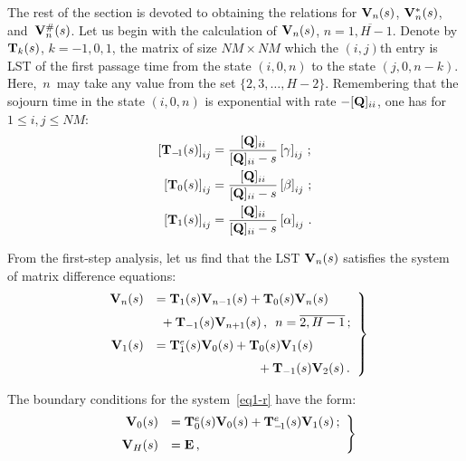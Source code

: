 \begin{multicols}{2}
The rest of the section is devoted to obtaining the relations for
$\mathbf{V}_n(s)$, $\mathbf{V}^*_n(s)$, and~$\mathbf{V}^{\#}_n(s)$.
Let us begin with the calculation of $\mathbf{V}_n(s)$,
$n=\overline{1,H-1}$. 
Denote by 
$\mathbf{T}_k(s)$, $k=-1,0,1$, the 
matrix of size $NM \times NM$ 
which the $(i,j)${th} entry is 
LST of the first passage time
from the state $(i,0,n)$ 
to the state $(j,0,n-k)$.
Here,~$n$~may take any value from 
the set $\{2,3,\dots,H-2\}$. 
Remembering that the sojourn time 
in the state $(i,0,n)$ is exponential 
with rate $-[\mathbf{Q}]_{ii}$, one has for 
$1 \le i,j \le NM$:
\begin{align*}
\left[ \mathbf{T}_{-\!1}(s) \right]_{ij}
&=
\displaystyle\frac{\displaystyle [\mathbf{Q}]_{ii} \mathstrut}{\displaystyle [\mathbf{Q}]_{ii} - s\mathstrut}
\left[\gamma\right]_{ij}  \,;
\\
\left[ \mathbf{T}_0(s) \right]_{ij}
&=
\displaystyle\frac{\displaystyle [\mathbf{Q}]_{ii}\mathstrut}{\displaystyle [\mathbf{Q}]_{ii} - s\mathstrut}
\left[\beta\right]_{ij}  \,;
\\
\left[ \mathbf{T}_1(s) \right]_{ij}
&=
\displaystyle\frac{\displaystyle [\mathbf{Q}]_{ii} \mathstrut}{\displaystyle [\mathbf{Q}]_{ii} - s\mathstrut}
\left[\alpha\right]_{ij} \,.
\end{align*}

\noindent 
From the first-step analysis, let us find that
the LST $\mathbf{V}_n(s)$ satisfies the system of matrix 
difference equations: 
\begin{equation}
\left.
\begin{array}{rl}
\bmx{V}_n(s)&=\bmx{T}_1(s) \bmx{V}_{n-1}(s)+ 
\bmx{T}_0(s) \bmx{V}_{n}(s)\\[6pt]
&\hspace*{1mm}{}+ \bmx{T}_{-1}(s) \bmx{V}_{n+1}(s)\,,\enskip
n=\overline{2,H-1}\,;
\\[6pt]
\bmx{V}_1(s)
&= \bmx{T}^e_1(s)  \bmx{V}_{0}(s) +  \bmx{T}_0(s)  \bmx{V}_{1}(s)\\[6pt]
&\hspace*{28mm}{} + 
\bmx{T}_{-1}(s)  \bmx{V}_{2}(s)\,.
\end{array}
\right\}
\label{eq1-r}
\end{equation}

\noindent The boundary conditions for the system~\eqref{eq1-r} 
have the form:
\begin{equation}
\left.
\begin{array}{rl}
\mathbf{V}_{0}(s)&= \mathbf{T}^e_0(s)  \mathbf{V}_{0}(s)
+  \mathbf{T}^e_{-\!1}(s)  \mathbf{V}_{1}(s) \,;
\\[6pt]
\mathbf{V}_{H}(s)
&=\mathbf{E} \,,
\end{array}
\right\}
\label{eq12b}
\end{equation}


\end{multicols}
